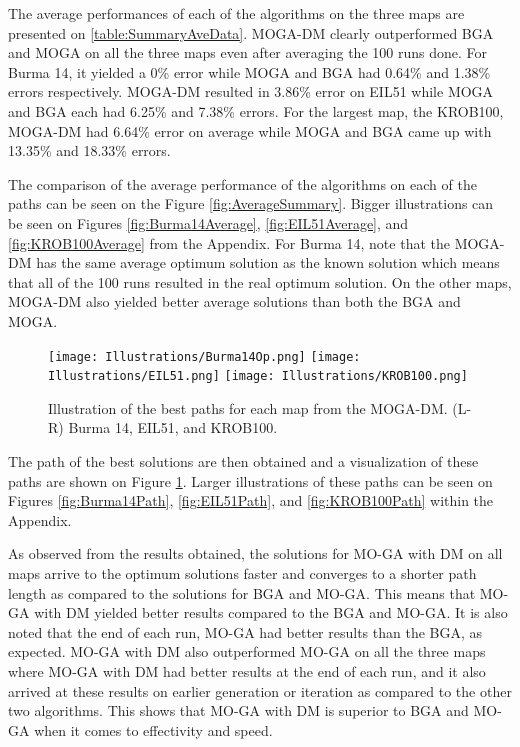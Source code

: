 The average performances of each of the algorithms on the three maps are presented on \ref{table:SummaryAveData}. MOGA-DM clearly outperformed BGA and MOGA on all the three maps even after averaging the 100 runs done. For Burma 14, it yielded a 0\% error while MOGA and BGA had 0.64\% and 1.38\% errors respectively. MOGA-DM resulted in 3.86\% error on EIL51 while MOGA and BGA each had 6.25\% and 7.38\% errors. For the largest map, the KROB100, MOGA-DM had 6.64\% error on average while MOGA and BGA came up with 13.35\% and 18.33\% errors. 

The comparison of the average performance of the algorithms on each of the paths can be seen on the Figure \ref{fig:AverageSummary}. Bigger illustrations can be seen on Figures \ref{fig:Burma14Average}, \ref{fig:EIL51Average}, and  \ref{fig:KROB100Average} from the Appendix. For Burma 14, note that the MOGA-DM has the same average optimum solution as the known solution which means that all of the 100 runs resulted in the real optimum solution. On the other maps, MOGA-DM also yielded better average solutions than both the BGA and MOGA.

\begin{figure}[htp]
	
	\centering
	\texttt{[image: Illustrations/Burma14Op.png]}\hfill
	\texttt{[image: Illustrations/EIL51.png]}\hfill
	\texttt{[image: Illustrations/KROB100.png]}
	
	\caption{Illustration of the best paths for each map from the MOGA-DM. (L-R) Burma 14, EIL51, and KROB100.}
	\label{fig:OptimumPaths}
	
\end{figure}

The path of the best solutions are then obtained and a visualization of these paths are shown on Figure \ref{fig:OptimumPaths}. Larger illustrations of these paths can be seen on Figures \ref{fig:Burma14Path}, \ref{fig:EIL51Path}, and  \ref{fig:KROB100Path} within the Appendix.

As observed from the results obtained, the solutions for MO-GA with DM on all maps arrive to the optimum solutions faster and converges to a shorter path length as compared to the solutions for BGA and MO-GA. This means that MO-GA with DM yielded better results compared to the BGA and MO-GA. It is also noted that the end of each run, MO-GA had better results than the BGA, as expected. MO-GA with DM also outperformed MO-GA on all the three maps where MO-GA with DM had better results at the end of each run, and it also arrived at these results on earlier generation or iteration as compared to the other two algorithms. This shows that MO-GA with DM is superior to BGA and MO-GA when it comes to effectivity and speed.